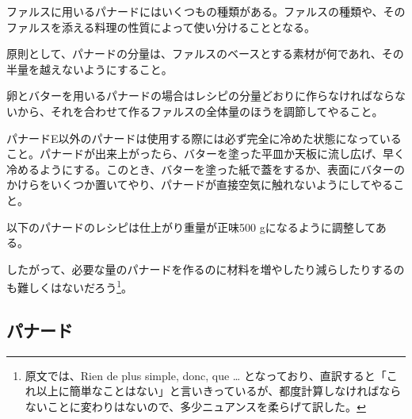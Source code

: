 \begin{Main}


ファルスに用いるパナードにはいくつもの種類がある。ファルスの種類や、そのファルスを添える料理の性質によって使い分けることとなる。

原則として、パナードの分量は、ファルスのベースとする素材が何であれ、その半量を越えないようにすること。

卵とバターを用いるパナードの場合はレシピの分量どおりに作らなければならないから、それを合わせて作るファルスの全体量のほうを調節してやること。

パナードE以外のパナードは使用する際には必ず完全に冷めた状態になっていること。パナードが出来上がったら、バターを塗った平皿か天板に流し広げ、早く冷めるようにする。このとき、バターを塗った紙で蓋をするか、表面にバターのかけらをいくつか置いてやり、パナードが直接空気に触れないようにしてやること。

以下のパナードのレシピは仕上がり重量が正味500
gになるように調整してある。

したがって、必要な量のパナードを作るのに材料を増やしたり減らしたりするのも難しくはないだろう\footnote{原文では、Rien
  de plus simple, donc, que \ldots{}
  となっており、直訳すると「これ以上に簡単なことはない」と言いきっているが、都度計算しなければならないことに変わりはないので、多少ニュアンスを柔らげて訳した。}。

\hypertarget{panades}{%
\subsection{パナード}\label{panades}}


 

\end{Main}

